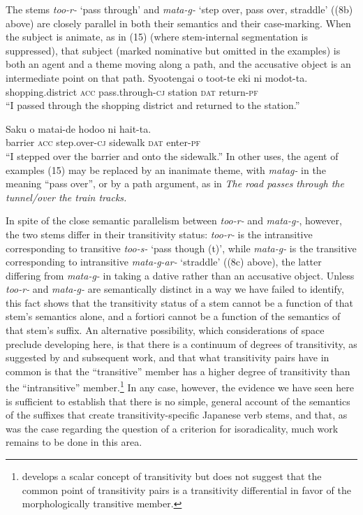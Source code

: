 \documentclass[output=paper,
modfonts
]{LSP/langsci}
\begin{document}
The stems \textit{too-r-} `pass through' and \textit{mata-g-} `step over,
pass over, straddle' ((8b) above) are closely parallel in both their
semantics and their case-marking. When the subject is animate, as in
(15) (where stem-internal segmentation is suppressed), that subject
(marked nominative but omitted in the examples) is both an agent and a
theme moving along a path, and the accusative object is an intermediate
point on that path.
\ea
	\ea 
	\gll Syootengai o toot-te eki ni modot-ta.\\
	shopping.district \textsc{acc} pass.through-\textsc{cj} station \textsc{dat} return-\textsc{pf}\\
	\glt ``I passed through the shopping district and returned to the station.''

	\ex 
	\gll Saku o matai-de hodoo ni hait-ta. \\
	barrier \textsc{acc} step.over-\textsc{cj} sidewalk \textsc{dat} enter-\textsc{pf}\\
	\glt ``I stepped over the barrier and onto the sidewalk.''
	\z
\z
In other uses, the agent of examples (15) may be replaced by an
inanimate theme, with \textit{matag-} in the meaning ``pass over'', or by
a path argument, as in \textit{The road passes through the tunnel/over the
train tracks.}

In spite of the close semantic parallelism between \textit{too-r-} and
\textit{mata-g-}, however, the two stems differ in their transitivity
status: \textit{too-r-} is the intransitive corresponding to transitive
\textit{too-s-} `pass though (t)', while \textit{mata-g-} is the transitive
corresponding to intransitive \textit{mata-g-ar-} `straddle' ((8c) above),
the latter differing from \textit{mata-g-} in taking a dative rather than
an accusative object. Unless \textit{too-r-} and \textit{mata-g-} are
semantically distinct in a way we have failed to identify, this fact
shows that the transitivity status of a stem cannot be a function of
that stem's semantics alone, and a fortiori cannot be a function of the
semantics of that stem's suffix. An alternative possibility, which
considerations of space preclude developing here, is that there is a
continuum of degrees of transitivity, as suggested by \citet{hopper1980a} and subsequent work, and that what transitivity pairs
have in common is that the ``transitive'' member has a higher degree of
transitivity than the ``intransitive'' member.\footnote{\citet[73--74]{jacobsen1992a} develops a scalar concept of transitivity but does not suggest that the common point of transitivity pairs is a transitivity
  differential in favor of the morphologically transitive member.} In
any case, however, the evidence we have seen here is sufficient to
establish that there is no simple, general account of the semantics of
the suffixes that create transitivity-specific Japanese verb stems, and
that, as was the case regarding the question of a criterion for
isoradicality, much work remains to be done in this area.
\end{document}
